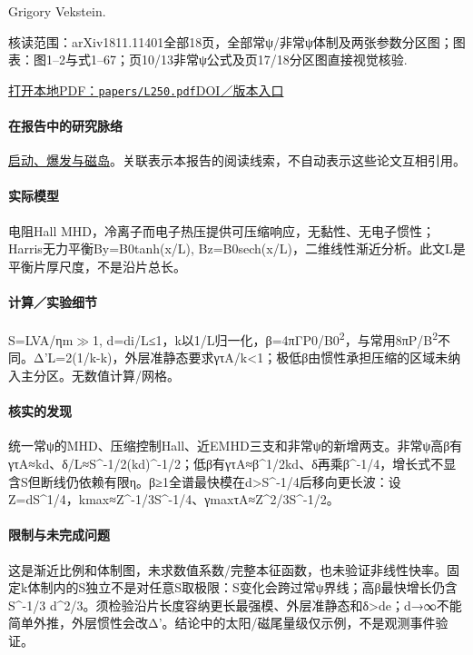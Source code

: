 \documentclass[UTF8,a4paper,11pt,openany,fontset=fandol]{ctexbook}
\begin{document}
Grigory Vekstein.

\textsf{核读范围：}arXiv1811.11401全部18页，全部常ψ/非常ψ体制及两张参数分区图；\textsf{图表：}图1–2与式1–67；页10/13非常ψ公式及页17/18分区图直接视觉核验.

\href{run:../papers/L250.pdf}{打开本地PDF：\texttt{papers/L250.pdf}}\quad\href{https://arxiv.org/abs/1811.11401}{DOI／版本入口}

\paragraph{在报告中的研究脉络}\hyperref[story:onset]{启动、爆发与磁岛}。关联表示本报告的阅读线索，不自动表示这些论文互相引用。

\paragraph{实际模型}电阻Hall MHD，冷离子而电子热压提供可压缩响应，无黏性、无电子惯性；Harris无力平衡By=B0tanh(x/L), Bz=B0sech(x/L)，二维线性渐近分析。此文L是平衡片厚尺度，不是沿片总长。

\paragraph{计算／实验细节}S=LVA/ηm\ensuremath{\gg}1, d=di/L≤1，k以1/L归一化，β=4πΓP0/B0\textsuperscript{2}，与常用8πP/B\textsuperscript{2}不同。Δ'L=2(1/k-k)，外层准静态要求γτA/k<1；极低β由惯性承担压缩的区域未纳入主分区。无数值计算/网格。

\paragraph{核实的发现}统一常ψ的MHD、压缩控制Hall、近EMHD三支和非常ψ的新增两支。非常ψ高β有γτA≈kd、δ/L≈S\textasciicircum{}-1/2(kd)\textasciicircum{}-1/2；低β有γτA≈β\textasciicircum{}1/2kd、δ再乘β\textasciicircum{}-1/4，增长式不显含S但断线仍依赖有限η。β≥1全谱最快模在d>S\textasciicircum{}-1/4后移向更长波：设Z=dS\textasciicircum{}1/4，kmax≈Z\textasciicircum{}-1/3S\textasciicircum{}-1/4、γmaxτA≈Z\textasciicircum{}2/3S\textasciicircum{}-1/2。

\paragraph{限制与未完成问题}这是渐近比例和体制图，未求数值系数/完整本征函数，也未验证非线性快率。固定k体制内的S独立不是对任意S取极限：S变化会跨过常ψ界线；高β最快增长仍含S\textasciicircum{}-1/3 d\textasciicircum{}2/3。须检验沿片长度容纳更长最强模、外层准静态和δ>de；d→∞不能简单外推，外层惯性会改Δ'。结论中的太阳/磁尾量级仅示例，不是观测事件验证。
\end{document}
